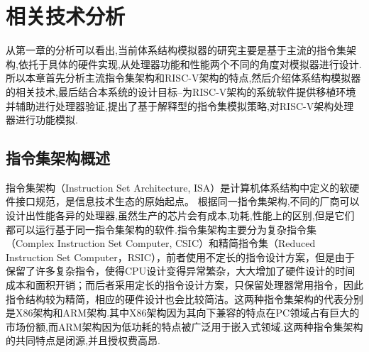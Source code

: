 
\chapter{相关技术分析}

从第一章的分析可以看出,当前体系结构模拟器的研究主要是基于主流的指令集架构,依托于具体的硬件实现,从处理器功能和性能两个不同的角度对模拟器进行设计.所以本章首先分析主流指令集架构和RISC-V架构的特点,然后介绍体系结构模拟器的相关技术,最后结合本系统的设计目标--为RISC-V架构的系统软件提供移植环境并辅助进行处理器验证,提出了基于解释型的指令集模拟策略,对RISC-V架构处理器进行功能模拟.

\section{指令集架构概述}

指令集架构（Instruction Set Architecture, ISA）是计算机体系结构中定义的软硬件接口规范，是信息技术生态的原始起点\cite{刘畅2021risc}。
根据同一指令集架构,不同的厂商可以设计出性能各异的处理器,虽然生产的芯片会有成本,功耗,性能上的区别,但是它们都可以运行基于同一指令集架构的软件.指令集架构主要分为复杂指令集（Complex Instruction Set Computer, CSIC）和精简指令集（Reduced Instruction Set Computer，RSIC），前者使用不定长的指令设计方案，但是由于保留了许多复杂指令，使得CPU设计变得异常繁杂，大大增加了硬件设计的时间成本和面积开销；而后者采用定长的指令设计方案，只保留处理器常用指令，因此指令结构较为精简，相应的硬件设计也会比较简洁。这两种指令集架构的代表分别是X86架构和ARM架构.其中X86架构因为其向下兼容的特点在PC领域占有巨大的市场份额,而ARM架构因为低功耗的特点被广泛用于嵌入式领域.这两种指令集架构的共同特点是闭源,并且授权费高昂.



